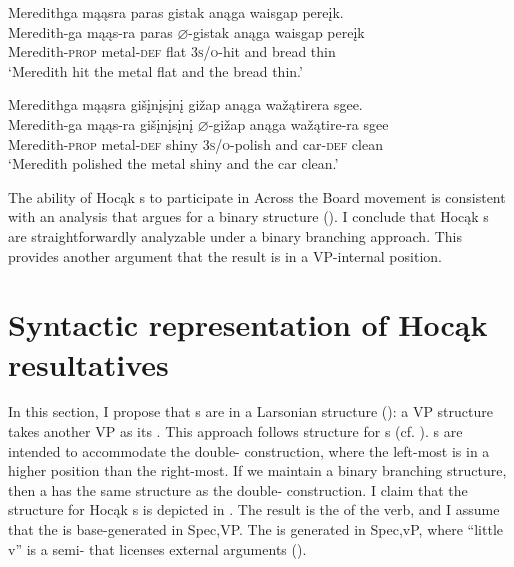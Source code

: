 \documentclass[output=paper]{LSP/langsci}
\begin{document}
\ea
\label{ex:rosen:26}
\ea \glll Meredithga mąąsra paras gistak anąga waisgap pereįk. \\
Meredith-ga mąąs-ra paras {$\varnothing$}-gistak anąga waisgap pereįk\\
Meredith-\textsc{prop} metal-\textsc{def} flat \textsc{3s/o}-hit and bread thin\\
\glt `Meredith hit the metal flat and the bread thin.'

\ex 
\glll Meredithga  mąąsra   gišįnį{s}įnį gižap                 anąga wažątirera sgee.\\
      Meredith-ga mąąs-ra  gišįnį{s}įnį {$\varnothing$}-gižap anąga wažątire-ra sgee\\
      Meredith-\textsc{prop} metal-\textsc{def} shiny  \textsc{3s/o}-polish and  car-\textsc{def} clean \\
\glt `Meredith polished the metal shiny and the car clean.'
\z
\z

The ability of Hocąk s to participate in Across the Board movement is consistent with an analysis that argues for a binary structure (\citealt{Bowers1997}). I conclude that Hocąk s are straightforwardly analyzable under a binary branching approach. This provides another argument that the result is in a VP-internal position.
 
\section{Syntactic representation of  Hocąk  resultatives}\label{sec:rosen:4}
 
In this section, I propose that s are in a Larsonian  structure (\citealt{Larson1988}): a VP structure takes another VP as its . This approach follows  structure for  s (cf. \citealt{Hoekstra1988,Carrier1992,LevinRappaportHovav1995}).  s are intended to accommodate the double- construction, where the left-most  is in a higher position than the right-most. If we maintain a binary branching structure, then a  has the same structure as the double- construction. I claim that the structure for Hocąk s is depicted in . The result  is the  of the verb, and I assume that the  is base-generated in Spec,VP. The  is generated in Spec,vP, where ``little v'' is a semi- that licenses external arguments (\citealt{Chomsky1995}).
 
\end{document}
